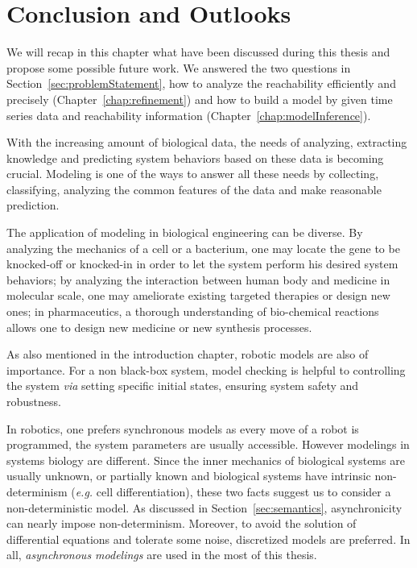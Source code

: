 \chapter{Conclusion and Outlooks}\label{chap:conclusion}
\begin{mybox}
We will recap in this chapter what have been discussed during this thesis and propose some possible future work.
We answered the two questions in Section~\ref{sec:problemStatement}, how to analyze the reachability efficiently and precisely (Chapter~\ref{chap:refinement}) and how to build a model by given time series data and reachability information (Chapter~\ref{chap:modelInference}).

\end{mybox}

With the increasing amount of biological data, the needs of analyzing, extracting knowledge and predicting system behaviors based on these data is becoming crucial.
Modeling is one of the ways to answer all these needs by collecting, classifying, analyzing the common features of the data and make reasonable prediction.

The application of modeling in biological engineering can be diverse. 
By analyzing the mechanics of a cell or a bacterium, one may locate the gene to be knocked-off or knocked-in in order to let the system perform his desired system behaviors;
by analyzing the interaction between human body and medicine in molecular scale, one may ameliorate existing targeted therapies or design new ones;
in pharmaceutics, a thorough understanding of bio-chemical reactions allows one to design new medicine or new synthesis processes.

As also mentioned in the introduction chapter, robotic models are also of importance.
For a non black-box system, model checking is helpful to controlling the system \textit{via} setting specific initial states, ensuring system safety and robustness.

In robotics, one prefers synchronous models as every move of a robot is programmed, the system parameters are usually accessible.
However modelings in systems biology are different.
Since the inner mechanics of biological systems are usually unknown, or partially known and biological systems have intrinsic non-determinism (\textit{e.g.} cell differentiation), 
these two facts suggest us to consider a non-deterministic model.
As discussed in Section~\ref{sec:semantics}, asynchronicity can nearly impose non-determinism.
Moreover, to avoid the solution of differential equations and tolerate some noise, discretized models are preferred.
In all, \textit{asynchronous  modelings} are used in the most of this thesis.

